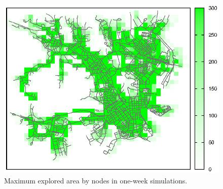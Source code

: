 \begin{figure}[htpb]
  \begin{center}
    \includegraphics[scale=0.85]{grafici/mappe/controlSet.eps}
    \caption{Maximum explored area by nodes in one-week simulations.}
    \label{fig:mapCoverage_controlSet}
  \end{center}
\end{figure}


